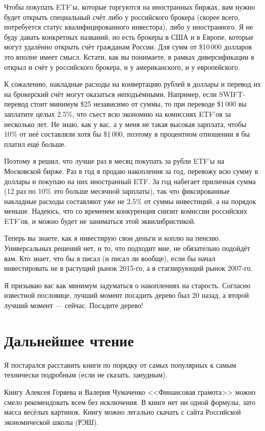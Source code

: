 Чтобы покупать ETF'ы, которые торгуются на иностранных биржах, вам нужно будет 
открыть специальный счёт либо у российского брокера (скорее всего, потребуется 
статус квалифицированного инвестора), либо у иностранного. Я не буду давать 
конкретных названий, но есть брокеры в США и в Европе, которые могут удалённо 
открыть счёт гражданам России. Для сумм от \$10\,000 долларов это вполне имеет 
смысл. Кстати, как вы понимаете, в рамках диверсификации я открыл и счёт у 
российского брокера, и у американского, и у европейского.

К сожалению, накладные расходы на конвертацию рублей в доллары и перевод их на 
брокерский счёт могут оказаться неподъёмными. Например, если SWIFT-перевод стоит 
минимум \$25 независимо от суммы, то при переводе \$1\,000 вы заплатите целых 
2.5\%, что съест всю экономию на комиссиях ETF'ов за несколько лет. Не знаю, как 
у вас, а у меня не такая высокая зарплата, чтобы 10\% от неё составляли хотя бы 
\$1\,000, поэтому в процентном отношении я бы платил ещё больше.

Поэтому я решил, что лучше раз в месяц покупать за рубли ETF'ы на Московской 
бирже. Раз в год я продаю накопления за год, перевожу всю сумму в доллары и 
покупаю на них иностранный ETF. За год набегает приличная сумма (12 раз по 10\% 
это больше месячной зарплаты), так что фиксированные накладные расходы 
составляют уже не 2.5\% от суммы инвестиций, а на порядок меньше. Надеюсь, что 
со временем конкуренция снизит комиссии российских ETF'ов, и можно будет не 
заниматься этой эквилибристикой.

Теперь вы знаете, как я инвестирую свои деньги и коплю на пенсию. Универсальных 
решений нет, и то, что подходит мне, не обязательно подойдёт вам. Кто знает, что 
бы я писал (и писал ли вообще), если бы начал инвестировать не в растущий рынок 
2015-го, а в стагнирующий рынок 2007-го.

Я призываю вас как минимум задуматься о накоплениях на старость. Согласно 
известной пословице, лучший момент посадить дерево был 20 назад, а второй лучший 
момент --- сейчас. Посадите дерево!

\section{Дальнейшее чтение}

Я постарался расставить книги по порядку от самых популярных к самым технически подробным (если не сказать, занудным).

Книгу Алексея Горяева и Валерия Чумаченко <<Финансовая грамота>> \cite{goryaev2009} можно смело рекомендовать всем без исключения. В книге нет ни одной формулы, зато масса весёлых картинок. Книгу можно легально скачать с сайта Российской экономической школы (РЭШ).

